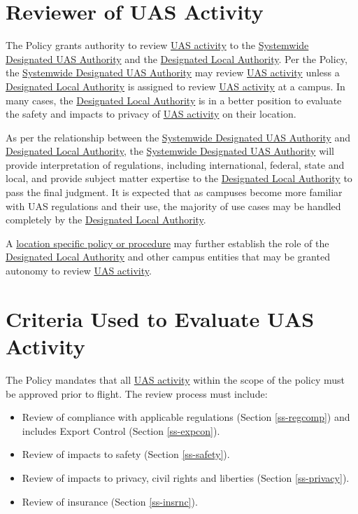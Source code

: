 \documentclass[
]{book}
\providecommand{\tightlist}{%
  \setlength{\itemsep}{0pt}\setlength{\parskip}{0pt}}
\begin{document}
\hypertarget{s-reviewer}{%
\section{Reviewer of UAS Activity}\label{s-reviewer}}

The Policy grants authority to review \protect\hyperlink{UASactivity}{UAS activity} to the \protect\hyperlink{SDA}{Systemwide Designated UAS Authority} and the \protect\hyperlink{DLA}{Designated Local Authority}. Per the Policy, the \protect\hyperlink{SDA}{Systemwide Designated UAS Authority} may review \protect\hyperlink{UASactivity}{UAS activity} unless a \protect\hyperlink{DLA}{Designated Local Authority} is assigned to review \protect\hyperlink{UASactivity}{UAS activity} at a campus. In many cases, the \protect\hyperlink{DLA}{Designated Local Authority} is in a better position to evaluate the safety and impacts to privacy of \protect\hyperlink{UASactivity}{UAS activity} on their location.

As per the relationship between the \protect\hyperlink{SDA}{Systemwide Designated UAS Authority} and \protect\hyperlink{DLA}{Designated Local Authority}, the \protect\hyperlink{SDA}{Systemwide Designated UAS Authority} will provide interpretation of regulations, including international, federal, state and local, and provide subject matter expertise to the \protect\hyperlink{DLA}{Designated Local Authority} to pass the final judgment. It is expected that as campuses become more familiar with UAS regulations and their use, the majority of use cases may be handled completely by the \protect\hyperlink{DLA}{Designated Local Authority}.

A \protect\hyperlink{LSP}{location specific policy or procedure} may further establish the role of the \protect\hyperlink{DLA}{Designated Local Authority} and other campus entities that may be granted autonomy to review \protect\hyperlink{UASactivity}{UAS activity}.

\hypertarget{s-ecrit}{%
\section{Criteria Used to Evaluate UAS Activity}\label{s-ecrit}}

The Policy mandates that all \protect\hyperlink{UASactivity}{UAS activity} within the scope of the policy must be approved prior to flight. The review process must include:

\begin{itemize}
\tightlist
\item
  Review of compliance with applicable regulations (Section \ref{ss-regcomp}) and includes Export Control (Section \ref{ss-expcon}).
\item
  Review of impacts to safety (Section \ref{ss-safety}).
\item
  Review of impacts to privacy, civil rights and liberties (Section \ref{ss-privacy}).
\item
  Review of insurance (Section \ref{ss-insrnc}).
\end{itemize}
\end{document}
